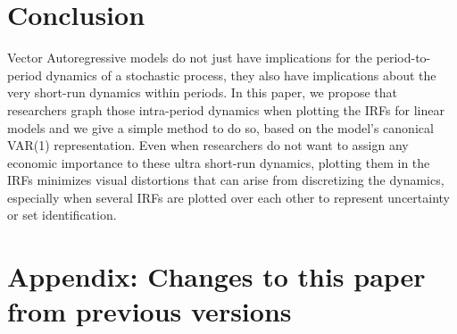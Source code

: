 \documentclass[12pt,fleqn]{article}
\begin{document}
\section{Conclusion}
\label{S4}

Vector Autoregressive models do not just have implications for the
period-to-period dynamics of a stochastic process, they also have
implications about the very short-run dynamics within periods. In this
paper, we propose that researchers graph those intra-period dynamics
when plotting the IRFs for linear models and we give a simple method
to do so, based on the model's canonical VAR(1) representation. Even
when researchers do not want to assign any economic importance to
these ultra short-run dynamics, plotting them in the IRFs minimizes
visual distortions that can arise from discretizing the dynamics,
especially when several IRFs are plotted over each other to
represent uncertainty or set identification.

\clearpage
{}


\clearpage
\appendix
\section{Appendix: Changes to this paper from previous versions}

\end{document}
